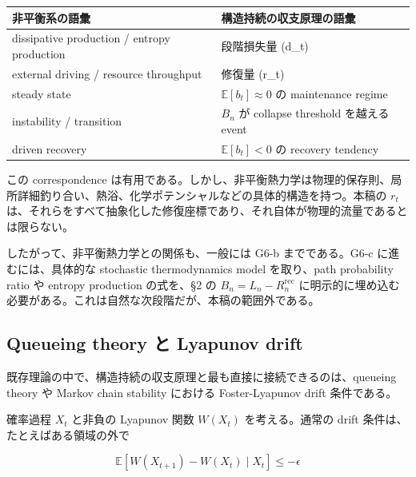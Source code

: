 \documentclass[12pt,a4paper]{article}
\begin{document}
{\def\LTcaptype{table} %
\begin{longtable}[]{@{}
  >{\raggedright\arraybackslash}p{}
  >{\raggedright\arraybackslash}p{}@{}}
\toprule\noalign{}
\begin{minipage}[b]{\linewidth}\raggedright
非平衡系の語彙
\end{minipage} & \begin{minipage}[b]{\linewidth}\raggedright
構造持続の収支原理の語彙
\end{minipage} \\
\midrule\noalign{}
\endhead
\bottomrule\noalign{}
\endlastfoot
dissipative production / entropy production & 段階損失量 (d\_t) \\
external driving / resource throughput & 修復量 (r\_t) \\
steady state & \(\mathbb E[b_t]\approx 0\) の maintenance regime \\
instability / transition & \(B_n\) が collapse threshold を越える event \\
driven recovery & \(\mathbb E[b_t]<0\) の recovery tendency \\
\end{longtable}
}

この correspondence は有用である。しかし、非平衡熱力学は物理的保存則、局所詳細釣り合い、熱浴、化学ポテンシャルなどの具体的構造を持つ。本稿の \(r_{t}\) は、それらをすべて抽象化した修復座標であり、それ自体が物理的流量であるとは限らない。

したがって、非平衡熱力学との関係も、一般には G6-b までである。G6-c に進むには、具体的な stochastic thermodynamics model を取り、path probability ratio や entropy production の式を、§2 の \(B_{n}=L_{n}-R_{n}^{\mathrm{rec}}\) に明示的に埋め込む必要がある。これは自然な次段階だが、本稿の範囲外である。

\subsection{Queueing theory と Lyapunov drift}\label{queueing-theory-ux3068-lyapunov-drift}

既存理論の中で、構造持続の収支原理と最も直接に接続できるのは、queueing theory や Markov chain stability における Foster-Lyapunov drift 条件である。

確率過程 \(X_{t}\) と非負の Lyapunov 関数 \(W(X_{t})\) を考える。通常の drift 条件は、たとえばある領域の外で

\[
\mathbb E[W(X_{t+1})-W(X_{t})\mid X_{t}]\le -\epsilon
\]
\end{document}
